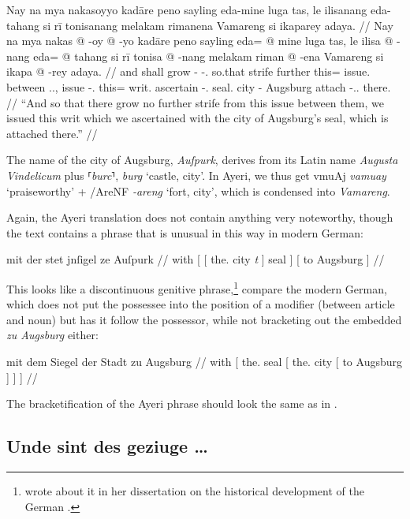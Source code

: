 \documentclass[12pt,paper=a4]{scrartcl}
\newcommand{\fw}[1]{\textit{#1}} %
\newcommand{\norm}[1]{⸢\textit{#1}⸣} %
\newcommand{\xayr}[3]{{\Tagati #1} \emph{#2} \enquote*{#3}}
\begin{document}
\ex \label{ex:11} \begingl
	\glpreamble Nay na mya nakasoyyo kadāre peno sayling eda-mine luga tas,
		le ilisanang eda-tahang si rī tonisanang melakam rimanena 
		Vamareng si ikaparey adaya. //
	\gla Nay na mya nakas @ -oy @ -yo kadāre peno sayling eda= @ mine luga 
		tas, le ilisa @ -nang eda= @ tahang si rī tonisa @ -nang 
		melakam riman @ -ena Vamareng si ikapa @ -rey adaya. //
	\glb and \GenT{} shall grow -\Neg{} -\Tsg{}.\N{} so.that strife further 
		this= issue.\Top{} between \Tsg{}.\M{}.\Loc{}, \PatT{} issue 
		-\Fpl{}.\Aarg{} this= writ.\Top{} \Rel{} \InsT{} ascertain 
		-\Fpl{}.\Aarg{} seal.\Top{} city -\Gen{} Augsburg \Rel{}
		attach -\Tsg{}.\Inan{}.\Parg{} there. //
	\glft \enquote{And so that there grow no further strife from this issue 
		between them, we issued this writ which we ascertained with the 
		city of Augsburg's seal, which is attached there.} //
\endgl \xe

The name of the city of Augsburg, \Mhg{} \fw{Auſpurk}, derives from its Latin 
name \fw{Augusta Vindelicum} plus \Mhg{} \norm{burc}, \Ohg{} \fw{burg} `castle, 
city'. In Ayeri, we thus get \xayr{vmuAj}{vamuay}{praiseworthy} + 
\xayr{/AreNF}{-areng}{fort, city}, which is condensed into \fw{Vamareng}.

Again, the Ayeri translation does not contain anything very noteworthy, though 
the \Mhg{} text contains a phrase that is unusual in this way in modern German:

\ex[exno=\ref{ex:11}.1] \begingl
	\gla mit {} {} der stet {} {} jnſigel {} {} ze Auſpurk {} //
	\glb with [ [ the.\Gen{} city \emph{t} ] seal ] [ to Augsburg ] //
\endgl \xe

This looks like a discontinuous genitive 
phrase,\footnote{\textcite[224~ff.]{demske2001} wrote about it in her 
dissertation on the historical development of the German \Np{}.} compare 
the modern German, which does not put the possessee into the position of a 
modifier (between article and noun) but has it follow the possessor, while not 
bracketing out the embedded \Pp{} \fw{zu Augsburg} either:

\ex[exno=\ref{ex:11}.2] \begingl
	\gla mit {} dem Siegel {} der Stadt {} zu Augsburg {} {} {} //
	\glb with [ the.\Dat{} seal [ the.\Gen{} city [ to Augsburg ] ] ] //
\endgl \xe

The bracketification of the Ayeri phrase should look the same as in \Nhg{}.

\subsection*{Unde sint des geziuge …}
\end{document}
